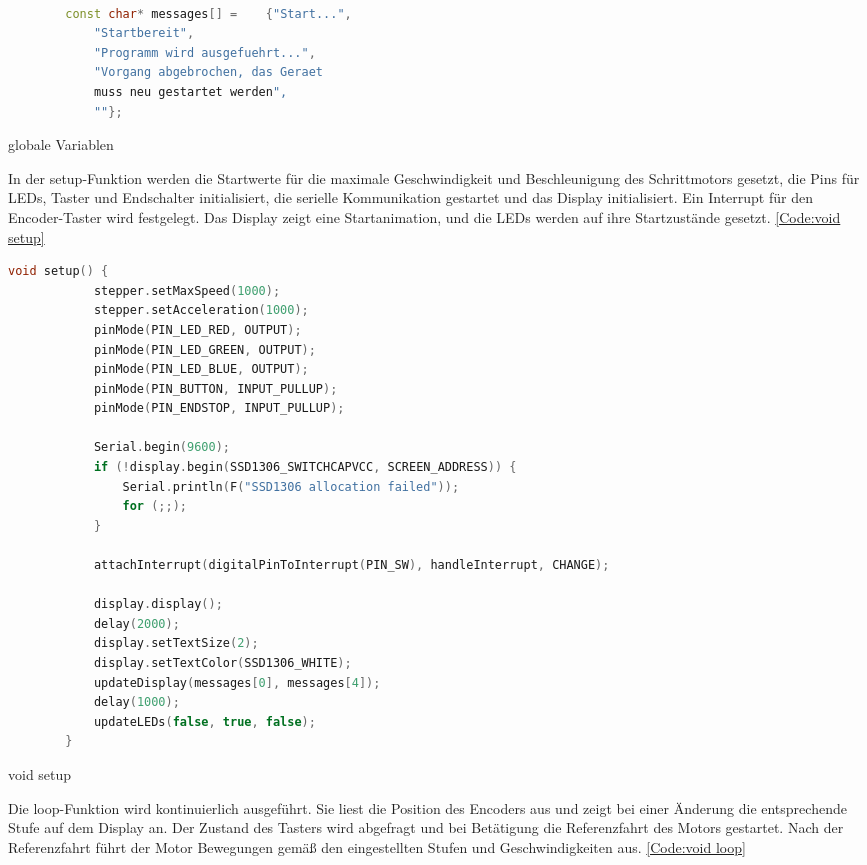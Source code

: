 {{{\begin{code}
\begin{lstlisting}[language=c++]
	\end{lstlisting}        
\end{code} 				

\begin{code}
	\begin{lstlisting}[language=c++]	
		
		const char* messages[] = 	{"Start...", 
			"Startbereit", 
			"Programm wird ausgefuehrt...", 
			"Vorgang abgebrochen, das Geraet
			muss neu gestartet werden", 
			""};
	\end{lstlisting}      
	
	\caption[globale Variablen]{globale Variablen}\label{Code:globale Variablen}    
\end{code} 

In der setup-Funktion werden die Startwerte für die maximale Geschwindigkeit und Beschleunigung des Schrittmotors gesetzt, die Pins für LEDs, Taster und Endschalter initialisiert, die serielle Kommunikation gestartet und das Display initialisiert. Ein Interrupt für den Encoder-Taster wird festgelegt. Das Display zeigt eine Startanimation, und die LEDs werden auf ihre Startzustände gesetzt. \ref{Code:void setup}

\begin{code}
	\begin{lstlisting}[language=c++]
		void setup() {
			stepper.setMaxSpeed(1000);
			stepper.setAcceleration(1000);
			pinMode(PIN_LED_RED, OUTPUT);
			pinMode(PIN_LED_GREEN, OUTPUT);
			pinMode(PIN_LED_BLUE, OUTPUT);
			pinMode(PIN_BUTTON, INPUT_PULLUP);
			pinMode(PIN_ENDSTOP, INPUT_PULLUP);
			
			Serial.begin(9600);
			if (!display.begin(SSD1306_SWITCHCAPVCC, SCREEN_ADDRESS)) {
				Serial.println(F("SSD1306 allocation failed"));
				for (;;);
			}
			
			attachInterrupt(digitalPinToInterrupt(PIN_SW), handleInterrupt, CHANGE);
			
			display.display();
			delay(2000);
			display.setTextSize(2);
			display.setTextColor(SSD1306_WHITE);
			updateDisplay(messages[0], messages[4]);
			delay(1000);
			updateLEDs(false, true, false);
		}
	\end{lstlisting}      
	
	\caption[void setup]{void setup}\label{Code:void setup}    
\end{code} 

Die loop-Funktion wird kontinuierlich ausgeführt. Sie liest die Position des Encoders aus und zeigt bei einer Änderung die entsprechende Stufe auf dem Display an. Der Zustand des Tasters wird abgefragt und bei Betätigung die Referenzfahrt des Motors gestartet. Nach der Referenzfahrt führt der Motor Bewegungen gemäß den eingestellten Stufen und Geschwindigkeiten aus. \ref{Code:void loop}

}}}
